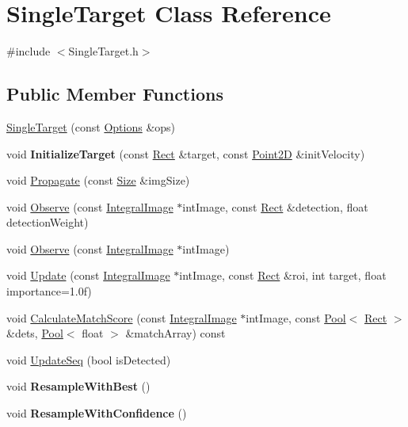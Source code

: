 \hypertarget{classSingleTarget}{}\section{Single\+Target Class Reference}
\label{classSingleTarget}


{\ttfamily \#include $<$Single\+Target.\+h$>$}

\subsection*{Public Member Functions}
\begin{DoxyCompactItemize}
\item 
\hyperlink{classSingleTarget_a0f9683df9354a8256f622db973130833}{Single\+Target} (const \hyperlink{structOptions}{Options} \&ops)
\item 
\hypertarget{classSingleTarget_afa791ad34c84b8a9d9d2e60398e5db2e}{}void {\bfseries Initialize\+Target} (const \hyperlink{classRect}{Rect} \&target, const \hyperlink{classPoint2D}{Point2\+D} \&init\+Velocity)\label{classSingleTarget_afa791ad34c84b8a9d9d2e60398e5db2e}

\item 
void \hyperlink{classSingleTarget_a2036d90f89d1a65966523c559aee3d38}{Propagate} (const \hyperlink{classSize}{Size} \&img\+Size)
\item 
void \hyperlink{classSingleTarget_a9ce84c111efa084c8bf9aa89736dffc8}{Observe} (const \hyperlink{classIntegralImage}{Integral\+Image} $\ast$int\+Image, const \hyperlink{classRect}{Rect} \&detection, float detection\+Weight)
\item 
void \hyperlink{classSingleTarget_a1e22348deeeae3e5d8d1c964df9c8fc8}{Observe} (const \hyperlink{classIntegralImage}{Integral\+Image} $\ast$int\+Image)
\item 
void \hyperlink{classSingleTarget_a5b2d2b9313f7d3bd8d96af68f840bff4}{Update} (const \hyperlink{classIntegralImage}{Integral\+Image} $\ast$int\+Image, const \hyperlink{classRect}{Rect} \&roi, int target, float importance=1.\+0f)
\item 
void \hyperlink{classSingleTarget_a450151cccff458e3603a34c99ccd4134}{Calculate\+Match\+Score} (const \hyperlink{classIntegralImage}{Integral\+Image} $\ast$int\+Image, const \hyperlink{classPool}{Pool}$<$ \hyperlink{classRect}{Rect} $>$ \&dets, \hyperlink{classPool}{Pool}$<$ float $>$ \&match\+Array) const 
\item 
void \hyperlink{classSingleTarget_aa620ca1f64fe972c8dc110e0a6012213}{Update\+Seq} (bool is\+Detected)
\item 
\hypertarget{classSingleTarget_a4b77b8dbe78d051ab5f190eef5b9a51a}{}void {\bfseries Resample\+With\+Best} ()\label{classSingleTarget_a4b77b8dbe78d051ab5f190eef5b9a51a}

\item 
\hypertarget{classSingleTarget_a8ba04565921bcbcce7a04c1c76daa4ca}{}void {\bfseries Resample\+With\+Confidence} ()\label{classSingleTarget_a8ba04565921bcbcce7a04c1c76daa4ca}

\end{DoxyCompactItemize}


